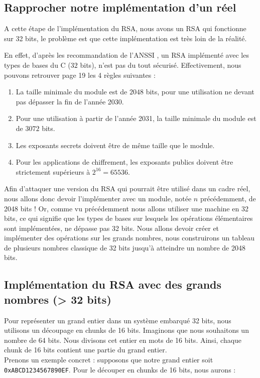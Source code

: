 \subsection{Rapprocher notre implémentation d'un réel}
A cette étape de l'implémentation du RSA, nous avons un RSA qui fonctionne sur 32 bits, le problème est que cette implémentation est très loin de la réalité.

En effet, d'après les recommandation de l'ANSSI \cite{anssi:guide}, un RSA implémenté avec les types de bases du C ($32$ bits), n'est pas du tout sécurisé. Effectivement, nous pouvons retrouver page 19 les 4 règles suivantes :
\begin{enumerate}
  \item La taille minimale du module est de $2048$ bits, pour une utilisation ne devant
pas dépasser la fin de l’année 2030.
  \item Pour une utilisation à partir de l’année 2031, la taille minimale du module
est de $3072$ bits.
  \item Les exposants secrets doivent être de même taille que le module.
  \item Pour les applications de chiffrement, les exposants publics doivent être strictement supérieurs à $2^{16} = 65536$.
\end{enumerate}
Afin d'attaquer une version du RSA qui pourrait être utilisé dans un cadre réel, nous allons donc devoir l'implémenter avec un module, notée $n$ précédemment, de 2048 bits ! Or, comme vu précédemment nous allons utiliser une machine en 32 bits, ce qui signifie que les types de bases sur lesquels les opérations élémentaires sont implémentées, ne dépasse pas 32 bits. Nous allons devoir créer et implémenter des opérations sur les grands nombres, nous construirons un tableau de plusieurs nombres classique de 32 bits jusqu'à atteindre un nombre de 2048 bits.

\subsection{Implémentation du RSA avec des grands nombres (> 32 bits)}
Pour représenter un grand entier dans un système embarqué 32 bits, nous utilisons un découpage en chunks de 16 bits. Imaginons que nous souhaitons un nombre de 64 bits. Nous divisons cet entier en mots de 16 bits. Ainsi, chaque chunk de 16 bits contient une partie du grand entier.\\

Prenons un exemple concret : supposons que notre grand entier soit \texttt{0xABCD1234567890EF}. Pour le découper en chunks de 16 bits, nous aurons :

